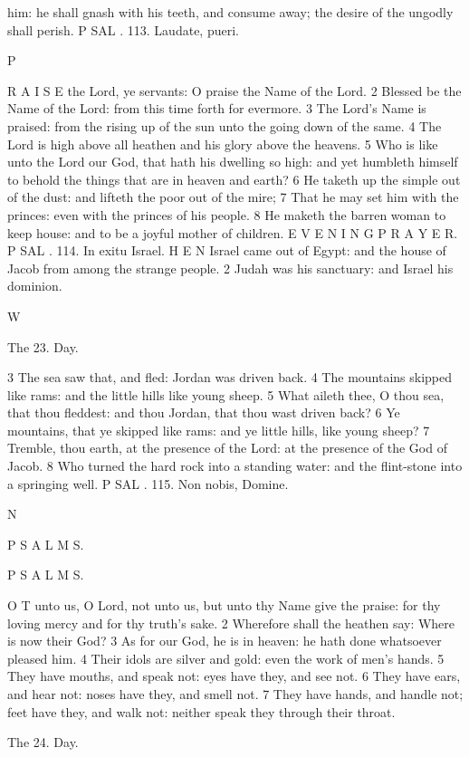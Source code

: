 him: he shall gnash with his teeth, and consume away; the desire of the ungodly shall perish. P SAL . 113. Laudate, pueri.

P

R A I S E the Lord, ye servants: O praise the Name of the Lord. 2 Blessed be the Name of the Lord: from this time forth for evermore. 3 The Lord’s Name is praised: from the rising up of the sun unto the going down of the same. 4 The Lord is high above all heathen and his glory above the heavens. 5 Who is like unto the Lord our God, that hath his dwelling so high: and yet humbleth himself to behold the things that are in heaven and earth? 6 He taketh up the simple out of the dust: and lifteth the poor out of the mire; 7 That he may set him with the princes: even with the princes of his people. 8 He maketh the barren woman to keep house: and to be a joyful mother of children. E V E N I N G P R A Y E R. P SAL . 114. In exitu Israel. H E N Israel came out of Egypt: and the house of Jacob from among the strange people. 2 Judah was his sanctuary: and Israel his dominion.

W

The 23. Day.

3 The sea saw that, and fled: Jordan was driven back. 4 The mountains skipped like rams: and the little hills like young sheep. 5 What aileth thee, O thou sea, that thou fleddest: and thou Jordan, that thou wast driven back? 6 Ye mountains, that ye skipped like rams: and ye little hills, like young sheep? 7 Tremble, thou earth, at the presence of the Lord: at the presence of the God of Jacob. 8 Who turned the hard rock into a standing water: and the flint-stone into a springing well. P SAL . 115. Non nobis, Domine.

N

P S A L M S.

P S A L M S.

O T unto us, O Lord, not unto us, but unto thy Name give the praise: for thy loving mercy and for thy truth’s sake. 2 Wherefore shall the heathen say: Where is now their God? 3 As for our God, he is in heaven: he hath done whatsoever pleased him. 4 Their idols are silver and gold: even the work of men’s hands. 5 They have mouths, and speak not: eyes have they, and see not. 6 They have ears, and hear not: noses have they, and smell not. 7 They have hands, and handle not; feet have they, and walk not: neither speak they through their throat.

The 24. Day.

